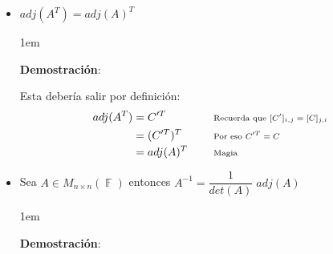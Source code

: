 \documentclass[12pt, fleqn]{report}                             %
\newenvironment{SmallIndentation}[1][0.75em]                    %
        {\begin{adjustwidth}{#1}{}\begin{footnotesize}}             %
        {\end{footnotesize}\end{adjustwidth}}                       %
\DeclareMathOperator \Space     {\quad}                         %
\newcommand \Remember[1]    {\Space\text{\scriptsize{#1}}}      %
\theoremstyle{break}                                            %
\DeclareMathOperator \GenericField {\mathbb{F}}                 %
\begin{document}
                \begin{itemize}

                    \item
                        $adj(A^T) = adj(A)^T$

                        \begin{SmallIndentation}[1em]
                            \textbf{Demostración}:
                            
                            Esta debería salir por definición:
                            \begin{align*}
                                adj(A^T)
                                    &= C'^T
                                        && \Remember{Recuerda que $[C']_{i, j} = [C]_{j, i}$ }   \\
                                    &= (C'^T)^T                                            
                                        && \Remember{Por eso $C'^T = C$ }   \\
                                    &= adj(A)^T
                                        && \Remember{Magia}
                            \end{align*}
                        
                        \end{SmallIndentation}
                            

                    \item
                        Sea $A \in M_{n \times n}(\GenericField)$ entonces
                        $A^{-1} = \dfrac{1}{det(A)} \; adj(A)$

                        \begin{SmallIndentation}[1em]
                            \textbf{Demostración}:
                            

\end{SmallIndentation}
\end{itemize}
\end{document}
